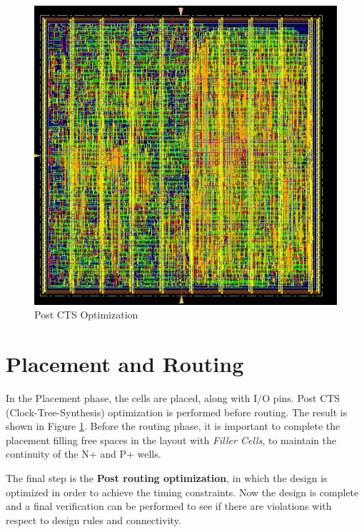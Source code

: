 \begin{figure}[h!]
	\centering
	\includegraphics[width=\textwidth]{chapters/figures/7.Post_CTS_optimization.jpg} 
	\caption{Post CTS Optimization}
	\label{fig:CTS_OPT}  
	\end{figure}

\section{Placement and Routing}
In the Placement phase, the cells are placed, along with I/O pins. Post CTS (Clock-Tree-Synthesis) optimization is performed before routing.
The result is shown in Figure \ref{fig:CTS_OPT}.
Before the routing phase, it is important to complete the placement filling free spaces in the layout with \textit{Filler Cells}, to maintain the continuity of the N+ and P+ wells.

The final step is the \textbf{Post routing optimization}, in which the design is optimized in order to achieve the timing constraints.
Now the design is complete and a final verification can be performed to see if there are violations with respect to design rules and connectivity.

